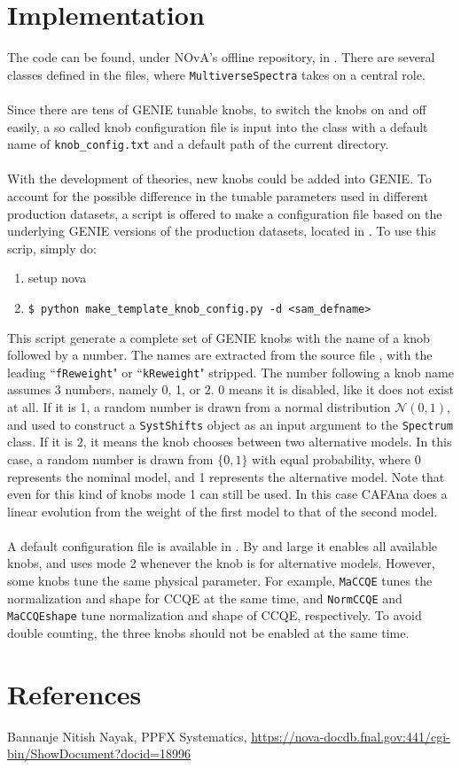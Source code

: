 \documentclass[12pt,a4paper,final]{iopart}
\begin{document}
\section{Implementation}
The code can be found, under NOvA's offline repository, in . There are several classes defined in the files, where \texttt{MultiverseSpectra} takes on a central role.\\\\
Since there are tens of GENIE tunable knobs, to switch the knobs on and off easily, a so called knob configuration file is input into the class with a default name of \texttt{knob\_config.txt} and a default path of the current directory.\\\\
With the development of theories, new knobs could be added into GENIE. To account for the possible difference in the tunable parameters used in different production datasets, a script is offered to make a configuration file based on the underlying GENIE versions of the production datasets, located in . To use this scrip, simply do:
\begin{enumerate}
  \item setup nova
  \item \texttt{\$ python make\_template\_knob\_config.py -d \textless sam\_defname\textgreater}
\end{enumerate}
This script generate a complete set of GENIE knobs with the name of a knob followed by a number. The names are extracted from the source file , with the leading ``\texttt{fReweight}" or ``\texttt{kReweight}" stripped. The number following a knob name assumes 3 numbers, namely 0, 1, or 2. 0 means it is disabled, like it does not exist at all. If it is 1, a random number is drawn from a normal distribution $\mathcal{N}(0,1)$, and used to construct a \texttt{SystShifts} object as an input argument to the \texttt{Spectrum} class. If it is 2, it means the knob chooses between two alternative models. In this case, a random number is drawn from $\{0,1\}$ with equal probability, where 0 represents the nominal model, and 1 represents the alternative model. Note that even for this kind of knobs mode 1 can still be used. In this case CAFAna does a linear evolution from the weight of the first model to that of the second model.\\\\
A default configuration file is available in . By and large it enables all available knobs, and uses mode 2 whenever the knob is for alternative models. However, some knobs tune the same physical parameter. For example, \texttt{MaCCQE} tunes the normalization and shape for CCQE at the same time, and \texttt{NormCCQE} and \texttt{MaCCQEshape} tune normalization and shape of CCQE, respectively. To avoid double counting, the three knobs should not be enabled at the same time.

\section*{References}
\begin{thebibliography}{10}
   Bannanje Nitish Nayak, PPFX Systematics, \url{https://nova-docdb.fnal.gov:441/cgi-bin/ShowDocument?docid=18996}
\end{thebibliography}
  
\end{document}

